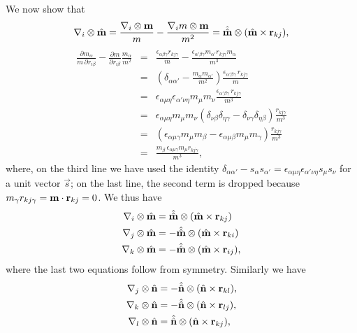 \documentclass{article}
\begin{document}
We now show that
\begin{equation}
\nabla_i \otimes \hat{\mathbf{m}}   
= \frac{ \nabla_i \otimes \mathbf{m}   } {m}
- \frac{ \nabla_i m \otimes \mathbf{m} } {m^2}   
= \hat{\hat{\mathbf{m}}} \otimes (\hat{\mathbf{m}} \times \mathbf{r}_{kj}),
\label{eq:dim1}
\end{equation}
%
\begin{eqnarray*}
  \frac {\partial m_{\alpha}} {m \, \partial r_{i \beta} } 
  -
  \frac {\partial m} {\partial r_{i \beta}} 
  \frac {m_\alpha} {m^2} 
  &=&
  \frac{ \epsilon_{\alpha \beta \gamma} r_{kj \gamma} } { m }
  - \frac{ \epsilon_{\alpha' \beta \gamma} m_{\alpha'} r_{k j \gamma} m_\alpha }
    { m^3 } \\ 
  &=& 
  \left( 
       \delta_{\alpha \alpha'} 
       - \frac{ m_\alpha m_{\alpha'} }{ m^2 } 
  \right)  
  \frac{\epsilon_{\alpha' \beta \gamma} \, r_{kj \gamma} } {m} \\
  &=&
   \epsilon_{\alpha \mu \eta} \epsilon_{\alpha' \nu \eta}
   m_\mu m_\nu
  \frac{\epsilon_{\alpha' \beta \gamma} \, r_{kj \gamma} } {m^3} \\
  &=&
  \epsilon_{\alpha \mu \eta}   m_\mu m_\nu
  (\delta_{\nu \beta} \delta_{\eta \gamma} - 
   \delta_{\nu \gamma} \delta_{\eta \beta})
  \frac{ r_{kj \gamma} } {m^3} \\
  &=&
  (\epsilon_{\alpha \mu \gamma}   m_\mu m_\beta  - 
   \epsilon_{\alpha \mu \beta}   m_\mu m_\gamma )
  \frac{ r_{kj \gamma} } {m^3} \\
  &=&
  \frac{m_\beta \, \epsilon_{\alpha \mu \gamma}  m_\mu  r_{kj \gamma}} {m^3},
\end{eqnarray*}
%
where, on the third line we have used the identity 
$ \delta_{\alpha \alpha'} - s_\alpha s_{\alpha'} 
 = \epsilon_{\alpha \mu \eta} \epsilon_{\alpha' \nu \eta} s_\mu s_\nu $
for a unit vector $\vec s$; 
%
on the last line, the second term is dropped because 
$m_\gamma r_{kj \gamma}  = \mathbf{m} \cdot \mathbf{r}_{kj} = 0$.
%
%
%
We thus have
%
\begin{equation}
\begin{split}
\nabla_i \otimes \hat{\mathbf{m}}   &=  \hat{\hat{\mathbf{m}}} \otimes (\hat{\mathbf{m}} \times \mathbf{r}_{kj}) \\
\nabla_j \otimes \hat{\mathbf{m}}   &=  -\hat{\hat{\mathbf{m}}} \otimes (\hat{\mathbf{m}} \times \mathbf{r}_{ki}) \\
\nabla_k \otimes \hat{\mathbf{m}}   &=  -\hat{\hat{\mathbf{m}}} \otimes (\hat{\mathbf{m}} \times \mathbf{r}_{ij}),
\end{split}
\end{equation}
where the last two equations follow from symmetry.  Similarly we have
%
%
\begin{equation}
\begin{split}
\nabla_j \otimes \hat{\mathbf{n}}   &=  -\hat{\hat{\mathbf{n}}} \otimes (\hat{\mathbf{n}} \times \mathbf{r}_{kl}), \\
\nabla_k \otimes \hat{\mathbf{n}}   &=  -\hat{\hat{\mathbf{n}}} \otimes (\hat{\mathbf{n}} \times \mathbf{r}_{lj}), \\
\nabla_l \otimes \hat{\mathbf{n}}   &=   \hat{\hat{\mathbf{n}}} \otimes (\hat{\mathbf{n}} \times \mathbf{r}_{kj}),
\end{split}
\end{equation}
\end{document}
